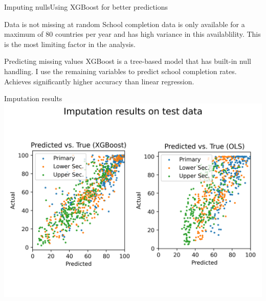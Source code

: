 \documentclass[10pt]{beamer}
\begin{document}
\begin{frame}{Imputing nulls}{Using XGBoost for better predictions}
    \begin{block}{Data is not missing at random}
        School completion data is only available for a maximum of 80 countries per year and has high variance in this availablility.
        This is the most limiting factor in the analysis.
    \end{block}

    \begin{block}{Predicting missing values}
        XGBoost is a tree-based model that has built-in null handling. I use the remaining variables to predict school completion rates.
        Achieves significantly higher accuracy than linear regression.
    \end{block}
    
\end{frame}

\begin{frame}{Imputation results}
    \centering
    \includegraphics[width=\textwidth]{../build/xgboost.png}
\end{frame}
\end{document}
